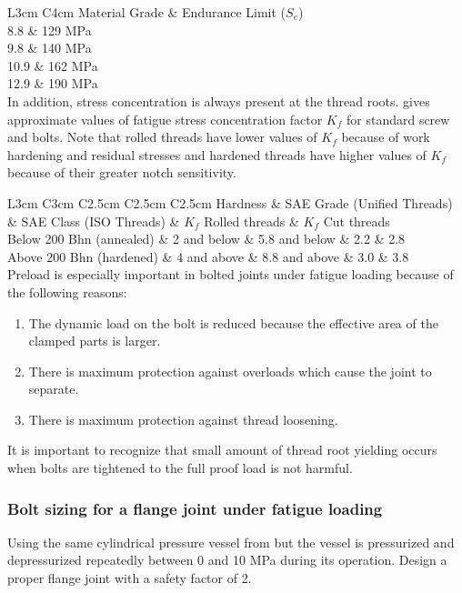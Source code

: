 \documentclass[a4paper,openany,nobib]{tufte-book}
\begin{document}
{{ L3cm C4cm Material Grade \& Endurance Limit (\(S_e\))\\
8.8 \& 129 MPa\\
9.8 \& 140 MPa\\
10.9 \& 162 MPa\\
12.9 \& 190 MPa\\

In addition, stress concentration is always present at the thread roots.
gives approximate values of fatigue stress concentration factor \(K_f\)
for standard screw and bolts. Note that rolled threads have lower values
of \(K_f\) because of work hardening and residual stresses and hardened
threads have higher values of \(K_f\) because of their greater notch
sensitivity.

 L3cm C3cm C2.5cm C2.5cm C2.5cm Hardness \& SAE Grade (Unified Threads) \&
SAE Class (ISO Threads) \& \(K_f\) Rolled threads \& \(K_f\) Cut threads\\
Below 200 Bhn (annealed) \& 2 and below \& 5.8 and below \& 2.2 \& 2.8\\
Above 200 Bhn (hardened) \& 4 and above \& 8.8 and above \& 3.0 \& 3.8\\

Preload is especially important in bolted joints under fatigue loading
because of the following reasons:

\begin{enumerate}
\item The dynamic load on the bolt is reduced because the effective area of
the clamped parts is larger.

\item There is maximum protection against overloads which cause the joint
to separate.

\item There is maximum protection against thread loosening.
\end{enumerate}

It is important to recognize that small amount of thread root yielding
occurs when bolts are tightened to the full proof load is not harmful.

\subsubsection{Bolt sizing for a flange joint under fatigue loading}
\label{sec:orgc60f720}

Using the same cylindrical pressure vessel from
but the vessel is pressurized and depressurized repeatedly between 0 and
10 MPa during its operation. Design a proper flange joint with a safety
factor of 2.

}}
\end{document}
